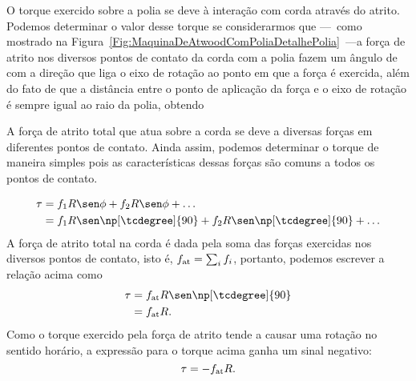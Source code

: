 O torque exercido sobre a polia se deve à interação com corda através do atrito. Podemos determinar o valor desse torque se considerarmos que ---~como mostrado na Figura~\ref{Fig:MaquinaDeAtwoodComPoliaDetalhePolia}~---a força de atrito nos diversos pontos de contato da corda com a polia fazem um ângulo de  com a direção que liga o eixo de rotação ao ponto em que a força é exercida, além do fato de que a distância entre o ponto de aplicação da força e o eixo de rotação é sempre igual ao raio da polia, obtendo
%
\begin{marginfigure}
\centering
{}
\caption{A força de atrito total que atua sobre a corda se deve a diversas forças em diferentes pontos de contato. Ainda assim, podemos determinar o torque de maneira simples pois as características dessas forças são comuns a todos os pontos de contato. \label{Fig:MaquinaDeAtwoodComPoliaDetalhePolia}}
\end{marginfigure}
%
\begin{align}
    \tau &= f_1 R \sen\phi + f_2 R \sen\phi + \dots \\
    &= f_1 R \sen\np[\tcdegree]{90} + f_2 R \sen\np[\tcdegree]{90} + \dots
\end{align}
%
A força de atrito total na corda é dada pela soma das forças exercidas nos diversos pontos de contato, isto é, $f_{\rm{at}} = \sum_{i} f_i$, portanto, podemos escrever a relação acima como
\begin{align}
    \tau &= f_{\rm{at}} R \sen\np[\tcdegree]{90} \\
    &= f_{\rm{at}} R.
\end{align}
%
Como o torque exercido pela força de atrito tende a causar uma rotação no sentido horário, a expressão para o torque acima ganha um sinal negativo:
\begin{equation}
    \tau = - f_{\rm{at}} R.
\end{equation}

